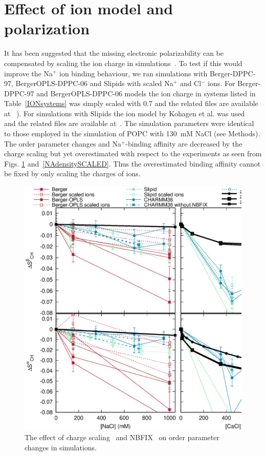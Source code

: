 \documentclass[twoside,twocolumn,9pt]{article}
\begin{document}
\section{Effect of ion model and polarization}
It has been suggested that the missing electronic polarizability 
can be compensated by scaling the ion charge in simulations~\cite{leontyev11}. 
To test if this would improve the Na$^+$ ion binding behaviour, we ran simulations with Berger-DPPC-97, BergerOPLS-DPPC-06
and Slipids with scaled Na$^+$ and Cl$^-$ ions. For Berger-DPPC-97 and BergerOPLS-DPPC-06 models 
the ion charge in systems listed in Table~\ref{IONsystems} was simply scaled with 0.7 and
the related files are available 
at ~\cite{DPPCBergerNaCl150mMscaled,DPPCBergerNaCl1000mMscaled,DPPCBergerOPLS06NaCl150mMscaled,DPPCBergerOPLS06NaCl1000mMscaled}). 
For simulations with Slipids the ion model by Kohagen et al. was used~\cite{kohagen16} and the related files are 
available at~\cite{slipidsFILESpopcSCALED}. The simulation parameters were identical to those employed in the simulation of POPC with 130~mM NaCl (see Methods).
The order parameter changes and Na$^+$-binding affinity are decreased by the charge scaling but 
yet overestimated with respect to the experiments as seen from Figs. \ref{OPchangesSCALED} and~\ref{NAdensitySCALED}. 
Thus the overestimated binding affinity cannot be fixed by only scaling the charges of ions.

\begin{figure}[]
  \centering
  \includegraphics[width=16cm]{../Fig/OrderParameterIONSchangesSCALED.eps} 
  \caption{\label{OPchangesSCALED}
    The effect of charge scaling~\cite{leontyev11,kohagen14} and NBFIX~\cite{venable13} on order parameter changes in simulations. 
    }
\end{figure}
\end{document}
